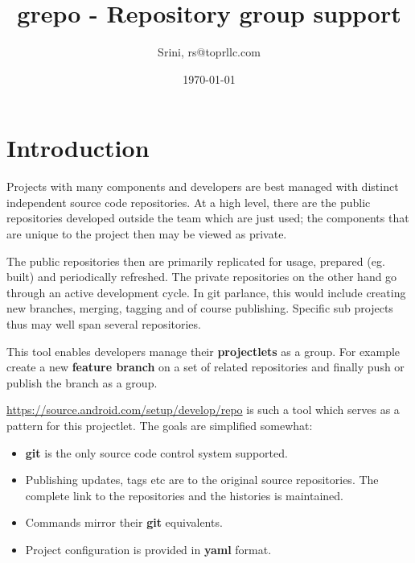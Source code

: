 \documentclass[11pt, a4paper]{article} %
\title{grepo - Repository group support} %
\author{Srini, rs@toprllc.com}
\date{\small \today} %
\begin{document}

%

\maketitle %

\setcounter{page}{1} %

\section{Introduction} %

Projects with many components and developers are best managed with distinct independent source code repositories. At a high level, there are
the public repositories developed outside the team which are just used; the components that are unique to the project then may be viewed as 
private.

The public repositories then are primarily replicated for usage, prepared (eg. built) and periodically refreshed. The private repositories on the other hand go through an active development cycle. In git parlance, this would include creating new branches, merging, tagging and of course publishing. Specific sub projects thus may well span several repositories.

This tool enables developers manage their \textbf{projectlets} as a group. For example create a new \textbf{feature branch} on a set of related repositories and finally push or publish the branch as a group.

\url{https://source.android.com/setup/develop/repo} is such a tool which serves as a pattern for this projectlet. The goals are simplified somewhat:

\begin{itemize}
    \item \textbf{git} is the only source code control system supported.
    \item Publishing updates, tags etc are to the original source repositories. The complete link to the repositories and the histories is maintained.
    \item Commands mirror their \textbf{git} equivalents. 
    \item Project configuration is provided in \textbf{yaml} format.
\end{itemize}
\end{document}
